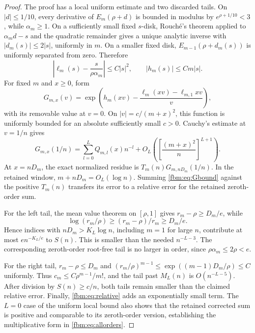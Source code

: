 \documentclass[11pt]{article}
\theoremstyle{remark}\newtheorem{remark}[theorem]{Remark}
\newcommand{\abs}[1]{\left|#1\right|}
\begin{document}
\begin{proof}
The proof has a local uniform estimate and two discarded tails. On $|d|\leq1/10$, every derivative of $E_m(\rho+d)$ is bounded in modulus by $e^{\rho+1/10}<3$, while $\alpha_m\geq1$. On a sufficiently small fixed $s$-disk, Rouch\'e's theorem applied to $\alpha_md-s$ and the quadratic remainder gives a unique analytic inverse with $|d_m(s)|\leq2|s|$, uniformly in $m$. On a smaller fixed disk, $E_{m-1}(\rho+d_m(s))$ is uniformly separated from zero. Therefore
\begin{equation}\label{fbm:eq:localbounds}
 \abs{\ell_m(s)-\frac{s}{\rho\alpha_m}}\leq C|s|^2,
 \qquad |h_m(s)|\leq Cm|s|.
\end{equation}
For fixed $m$ and $x\geq0$, form
\[
 G_{m,x}(v)=\exp\!\left(h_m(xv)-
       \frac{\ell_m(xv)-\ell_{m,1}xv}{v}\right),
\]
with its removable value at $v=0$. On $|v|=c/(m+x)^2$, this function is uniformly bounded for an absolute sufficiently small $c>0$. Cauchy's estimate at $v=1/n$ gives
\begin{equation}\label{fbm:eq:Gbound}
 G_{m,x}(1/n)=\sum_{l=0}^L Q_{m,l}(x)n^{-l}
       +O_L\!\left(\left[\frac{(m+x)^2}{n}\right]^{L+1}\right).
\end{equation}
At $x=nD_m$, the exact normalized residue is $T_m(n)G_{m,nD_m}(1/n)$. In the retained window, $m+nD_m=O_L(\log n)$. Summing \eqref{fbm:eq:Gbound} against the positive $T_m(n)$ transfers its error to a relative error for the retained zeroth-order sum.

For the left tail, the mean value theorem on $[\rho,1]$ gives $r_m-\rho\geq D_m/e$, while
\[
 \log(r_m/\rho)\geq(r_m-\rho)/r_m\geq D_m/e.
\]
Hence indices with $nD_m>K_L\log n$, including $m=1$ for large $n$, contribute at most $e n^{-K_L/e}$ to $S(n)$. This is smaller than the needed $n^{-L-3}$. The corresponding zeroth-order root-free tail is no larger in order, since $\rho\alpha_m\leq2\rho<e$.

For the right tail, $r_m-\rho\leq D_m$ and
$(r_m/\rho)^{m-1}\leq\exp((m-1)D_m/\rho)\leq C$ uniformly. Thus $c_m\leq C\rho^{m-1}/m!$, and the tail past $M_L(n)$ is $O(n^{-L-5})$. After division by $S(n)\geq c/n$, both tails remain smaller than the claimed relative error. Finally, \eqref{fbm:eq:relative} adds an exponentially small term. The $L=0$ case of the uniform local bound also shows that the retained corrected sum is positive and comparable to its zeroth-order version, establishing the multiplicative form in \eqref{fbm:eq:allorders}.
\end{proof}
\end{document}
